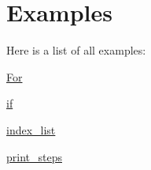 \section{Examples}
Here is a list of all examples:\begin{DoxyCompactItemize}
\item 
\hyperlink{For-example}{For}
\item 
\hyperlink{if-example}{if}
\item 
\hyperlink{index__list-example}{index\_\-list}
\item 
\hyperlink{print__steps-example}{print\_\-steps}
\end{DoxyCompactItemize}
